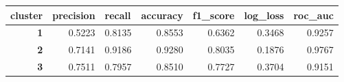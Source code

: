 \begin{tabular}{rrrrrrr}
    \toprule
    \multicolumn{1}{l}{\textbf{cluster}} &
    \multicolumn{1}{l}{\textbf{precision}} &
    \multicolumn{1}{l}{\textbf{recall}} &
    \multicolumn{1}{l}{\textbf{accuracy}} &
    \multicolumn{1}{l}{\textbf{f1\_score}} &
    \multicolumn{1}{l}{\textbf{log\_loss}} &
    \multicolumn{1}{l}{\textbf{roc\_auc}} \\
    \midrule
    \textbf{1} & 0.5223 & 0.8135 & 0.8553 & 0.6362 & 0.3468 & 0.9257 \\
    \textbf{2} & 0.7141 & 0.9186 & 0.9280 & 0.8035 & 0.1876 & 0.9767 \\
    \textbf{3} & 0.7511 & 0.7957 & 0.8510 & 0.7727 & 0.3704 & 0.9151 \\
    \bottomrule
\end{tabular}
